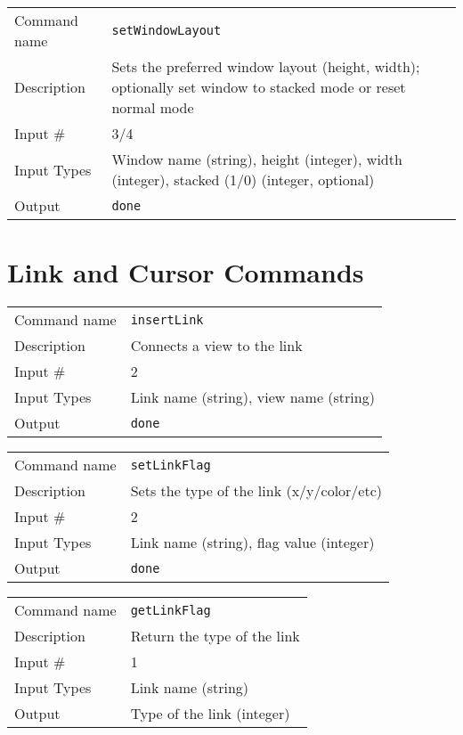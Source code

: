 \bigskip

\noindent
\begin{tabular}{l|p{5in}}
\hline
Command name & {\tt setWindowLayout} \\
Description  & Sets the preferred window layout (height, width); optionally
               set window to stacked mode or reset normal mode \\
Input \#     & 3/4 \\
Input Types  & Window name (string), height (integer), width (integer),
               stacked (1/0) (integer, optional) \\
Output       & {\tt done} \\
\hline
\end{tabular}

\section{Link and Cursor Commands}

\noindent
\begin{tabular}{l|p{5in}}
\hline
Command name & {\tt insertLink} \\
Description  & Connects a view to the link \\
Input \#     & 2 \\
Input Types  & Link name (string), view name (string) \\
Output       & {\tt done} \\
\hline
\end{tabular}

\bigskip

\noindent
\begin{tabular}{l|p{5in}}
\hline
Command name & {\tt setLinkFlag} \\
Description  & Sets the type of the link (x/y/color/etc) \\
Input \#     & 2 \\
Input Types  & Link name (string), flag value (integer) \\
Output       & {\tt done} \\
\hline
\end{tabular}

\bigskip

\noindent
\begin{tabular}{l|p{5in}}
\hline
Command name & {\tt getLinkFlag} \\
Description  & Return the type of the link \\
Input \#     & 1 \\
Input Types  & Link name (string) \\
Output       & Type of the link (integer) \\
\hline
\end{tabular}

